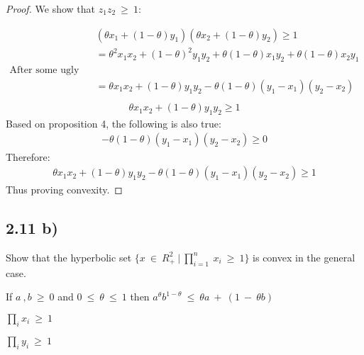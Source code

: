 \documentclass[12pt]{article}
\newenvironment{proposition}[2][Proposition]{\begin{trivlist}
\item[\hskip \labelsep {\bfseries #1}\hskip \labelsep {\bfseries #2.}]}{\end{trivlist}}
\begin{document}
\begin{proof}
We show that $z_1z_2\ \ge\ 1$:

\begin{align*}
& (\theta x_1 + (1-\theta) y_1)(\theta x_2 + (1-\theta) y_2) \ge 1\\
& = \theta^2x_1x_2 + (1-\theta)^2y_1y_2 + \theta(1-\theta)x_1y_2 + \theta(1-\theta)x_2y_1\\
\text{After some ugly algebra:}\\
& = \theta x_1x_2 + (1-\theta)y_1y_2 - \theta(1-\theta)(y_1-x_1)(y_2-x_2)\\
\end{align*}
\begin{align*}
\theta x_1x_2 + (1-\theta)y_1y_2 \ge 1
\end{align*}
Based on proposition 4, the following is also true:
\begin{align*}
- \theta(1-\theta)(y_1-x_1)(y_2-x_2) \ge 0
\end{align*}
Therefore:
\begin{align*}
\theta x_1x_2 + (1-\theta)y_1y_2 - \theta(1-\theta)(y_1-x_1)(y_2-x_2) \ge 1
\end{align*}
Thus proving convexity.
\end{proof}
 
\subsection*{2.11 b)}
Show that the hyperbolic set $\{x\ \in\ R^2_+\ |\ \prod^{n}_{i=1}\ x_i\ \ge\ 1\}$ is convex in the general case.\\

\begin{proposition}{1}
If $a\ ,b\ \ge\ 0$ and $0\ \le\ \theta\ \le\ 1$ then $a^{\theta}b^{1 - \theta}\ \le\ \theta a\ +\ (1\ -\ \theta b)$
\end{proposition}

\begin{proposition}{2}
$\prod_{i}x_i\ \ge\ 1$
\end{proposition}

\begin{proposition}{3}
$\prod_{i}y_i\ \ge\ 1$
\end{proposition}
\end{document}
